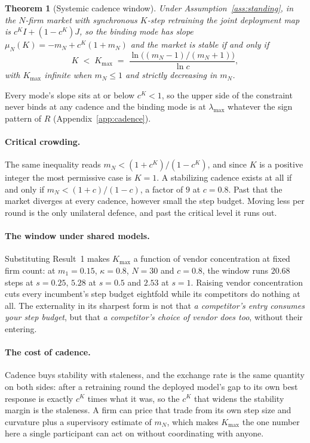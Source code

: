 \documentclass{article}
\theoremstyle{plain}
\newtheorem{theorem}{Theorem}
\theoremstyle{definition}
\newcommand{\mN}{m_N}
\newcommand{\lmax}{\lambda_{\max}}
\begin{document}
\begin{theorem}[Systemic cadence window]
\label{thm:cadence}
Under Assumption~\ref{ass:standing}, in the $N$-firm market with synchronous $K$-step retraining the joint deployment map is $c^K I + (1-c^K)J$, so the binding mode has slope $\mu_N(K) = -\mN + c^K(1+\mN)$ and the market is stable if and only if
\begin{equation}
K \;<\; K_{\max} \;=\; \frac{\ln\bigl((\mN-1)/(\mN+1)\bigr)}{\ln c},
\end{equation}
with $K_{\max}$ infinite when $\mN \le 1$ and strictly decreasing in $\mN$.
\end{theorem}

Every mode's slope sits at or below $c^K<1$, so the upper side of the constraint never binds at any cadence and the binding mode is at $\lmax$ whatever the sign pattern of $R$ (Appendix~\ref{app:cadence}).

\paragraph{Critical crowding.}
The same inequality reads $\mN < (1+c^K)/(1-c^K)$, and since $K$ is a positive integer the most permissive case is $K=1$. A stabilizing cadence exists at all if and only if $\mN < (1+c)/(1-c)$, a factor of $9$ at $c=0.8$. Past that the market diverges at every cadence, however small the step budget. Moving less per round is the only unilateral defence, and past the critical level it runs out.

\paragraph{The window under shared models.}
Substituting Result~1 makes $K_{\max}$ a function of vendor concentration at fixed firm count: at $m_1 = 0.15$, $\kappa = 0.8$, $N=30$ and $c=0.8$, the window runs $20.68$ steps at $s = 0.25$, $5.28$ at $s = 0.5$ and $2.53$ at $s = 1$. Raising vendor concentration cuts every incumbent's step budget eightfold while its competitors do nothing at all. The externality in its sharpest form is not that \emph{a competitor's entry consumes your step budget}, but that \emph{a competitor's choice of vendor does too}, without their entering.

\paragraph{The cost of cadence.}
Cadence buys stability with staleness, and the exchange rate is the same quantity on both sides: after a retraining round the deployed model's gap to its own best response is exactly $c^K$ times what it was, so the $c^K$ that widens the stability margin is the staleness. A firm can price that trade from its own step size and curvature plus a supervisory estimate of $\mN$, which makes $K_{\max}$ the one number here a single participant can act on without coordinating with anyone.
\end{document}
